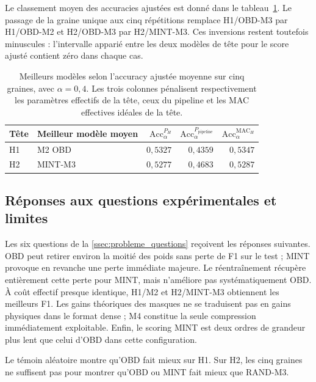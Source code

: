 Le classement moyen des accuracies ajustées est donné dans le
tableau~\ref{tab:accuracy_ajustee_repetee}. Le passage de la graine unique aux
cinq répétitions remplace H1/OBD-M3 par H1/OBD-M2 et H2/OBD-M3 par H2/MINT-M3.
Ces inversions restent toutefois minuscules : l'intervalle apparié entre les
deux modèles de tête pour le score ajusté contient zéro dans chaque cas.

\begin{table}[!htbp]
    \centering
    \begin{tabular}{|l|l|r|r|r|}
        \hline
        Tête & Meilleur modèle moyen &
        $\mathrm{Acc}_{\alpha}^{P_H}$ &
        $\mathrm{Acc}_{\alpha}^{P_{\mathrm{pipeline}}}$ &
        $\mathrm{Acc}_{\alpha}^{\mathrm{MAC}_H}$ \\ \hline
        H1 & M2 OBD & $0{,}5327$ & $0{,}4359$ & $0{,}5347$ \\ \hline
        H2 & MINT-M3 & $0{,}5277$ & $0{,}4683$ & $0{,}5287$ \\ \hline
    \end{tabular}
    \caption{Meilleurs modèles selon l'accuracy ajustée moyenne sur cinq
    graines, avec $\alpha=0{,}4$. Les trois colonnes pénalisent respectivement
    les paramètres effectifs de la tête, ceux du pipeline et les MAC effectives
    idéales de la tête.}
    \label{tab:accuracy_ajustee_repetee}
\end{table}

\subsection{Réponses aux questions expérimentales et limites}
\label{ssec:resultats_reponses_limites}

Les six questions de la \autoref{ssec:probleme_questions} reçoivent les
réponses suivantes. OBD peut retirer environ la moitié des poids sans perte de
F1 sur le test ; MINT provoque en revanche une perte immédiate majeure. Le
réentraînement récupère entièrement cette perte pour MINT, mais n'améliore pas
systématiquement OBD. À coût effectif presque identique, H1/M2 et H2/MINT-M3
obtiennent les meilleurs F1. Les gains théoriques des masques ne se traduisent
pas en gains physiques dans le format dense ; M4 constitue la seule compression
immédiatement exploitable. Enfin, le scoring MINT est deux ordres de grandeur
plus lent que celui d'OBD dans cette configuration.

Le témoin aléatoire montre qu'OBD fait mieux sur H1. Sur H2, les cinq graines ne
suffisent pas pour montrer qu'OBD ou MINT fait mieux que RAND-M3.

